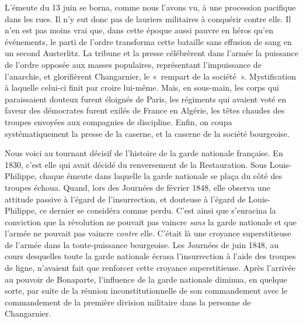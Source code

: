 \documentclass[french,twoside]{book} %
\begin{document}
L’émeute du 13 juin se borna, comme nous l’avons vu, à une procession pacifique dans les rues. Il n’y eut donc pas de lauriers militaires à conquérir contre elle. Il n’en est pas moins vrai que, dans cette époque aussi pauvre en héros qu’en événements, le parti de l’ordre transforma cette bataille sans effusion de sang en un second Austerlitz. La tribune et la presse célébrèrent dans l’armée la puissance de l’ordre opposée aux masses populaires, représentant l’impuissance de l’anarchie, et glorifièrent Changarnier, le « rempart de la société ». Mystification à laquelle celui-ci finit par croire lui-même. Mais, en sous-main, les corps qui paraissaient douteux furent éloignés de Paris, les régiments qui avaient voté en faveur des démocrates furent exilés de France en Algérie, les têtes chaudes des troupes envoyées aux compagnies de discipline. Enfin, on coupa systématiquement la presse de la caserne, et la caserne de la société bourgeoise.\par
Nous voici au tournant décisif de l’histoire de la garde nationale française. En 1830, c’est elle qui avait décidé du renversement de la Restauration. Sous Louis-Philippe, chaque émeute dans laquelle la garde nationale se plaça du côté des troupes échoua. Quand, lors des Journées de février 1848, elle observa une attitude passive à l’égard de l’insurrection, et douteuse à l’égard de Louis-Philippe, ce dernier se considéra comme perdu. C’est ainsi que s’enracina la conviction que la révolution ne pouvait pas vaincre \emph{sans} la garde nationale et que l’armée ne pouvait pas vaincre \emph{contre} elle. C’était là une croyance superstitieuse de l’armée dans la toute-puissance bourgeoise. Les Journées de juin 1848, au cours desquelles toute la garde nationale écrasa l’insurrection à l’aide des troupes de ligne, n’avaient fait que renforcer cette croyance superstitieuse. Après l’arrivée au pouvoir de Bonaparte, l’influence de la garde nationale diminua, en quelque sorte, par suite de la réunion inconstitutionnelle de son commandement avec le commandement de la première division militaire dans la personne de Changarnier.\par
\end{document}
